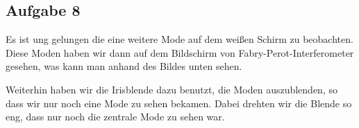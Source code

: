 \subsection{Aufgabe 8}

Es ist ung gelungen die eine weitere Mode auf dem weißen Schirm zu beobachten. Diese Moden haben wir dann auf dem Bildschirm von Fabry-Perot-Interferometer gesehen, was kann man anhand des Bildes unten sehen.


Weiterhin haben wir die Irisblende dazu benutzt, die Moden auszublenden, so dass wir nur noch eine Mode zu sehen bekamen. Dabei drehten wir die Blende so eng, dass nur noch die zentrale Mode zu sehen war.